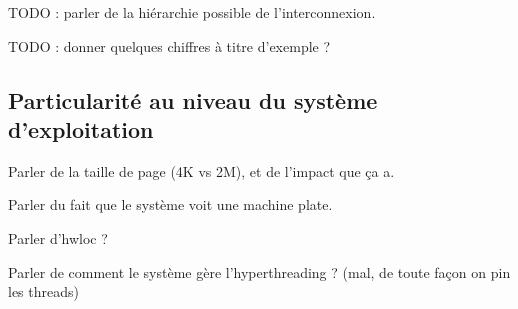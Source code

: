 TODO : parler de la hiérarchie possible de l'interconnexion.

TODO : donner quelques chiffres à titre d'exemple ?


\subsection{Particularité au niveau du système d'exploitation}


Parler de la taille de page (4K vs 2M), et de l'impact que ça a.

Parler du fait que le système voit une machine plate.

Parler d'hwloc ?

Parler de comment le système gère l'hyperthreading ? (mal, de toute façon on pin les threads)


